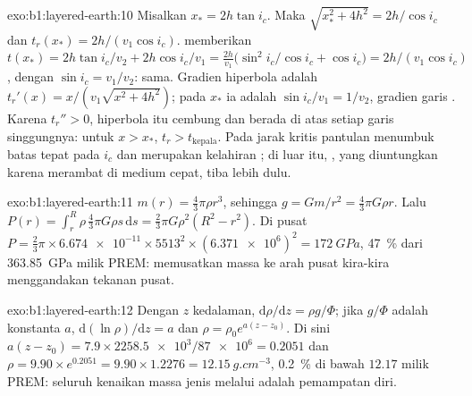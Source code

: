 \begin{solution}{exo:b1:layered-earth:10}
Misalkan $x_* = 2h\tan i_c$. Maka $\sqrt{x_*^2 + 4h^2} = 2h/\cos i_c$ dan
$t_r(x_*) = 2h/(v_1\cos i_c)$.  memberikan
$t(x_*) = 2h\tan i_c/v_2 + 2h\cos i_c/v_1 = \frac{2h}{v_1}\bigl(\sin^2 i_c/\cos
i_c + \cos i_c\bigr) = 2h/(v_1\cos i_c)$, dengan $\sin i_c = v_1/v_2$: sama.
Gradien hiperbola adalah $t_r'(x) = x/(v_1\sqrt{x^2 + 4h^2})$; pada $x_*$ ia adalah
$\sin i_c/v_1 = 1/v_2$, gradien garis . Karena
$t_r'' > 0$, hiperbola itu cembung dan berada di atas setiap garis singgungnya: untuk
$x > x_*$, $t_r > t_{\text{kepala}}$. Pada jarak kritis pantulan
menumbuk batas tepat pada $i_c$ dan merupakan kelahiran ; di luar itu,
, yang diuntungkan karena merambat di medium cepat, tiba lebih dulu.
\end{solution}

\begin{solution}{exo:b1:layered-earth:11}
$m(r) = \tfrac43\pi\rho r^3$, sehingga $g = Gm/r^2 = \tfrac43\pi G\rho r$. Lalu
$P(r) = \int_r^R \rho\,\tfrac43\pi G\rho s\,\mathrm ds = \tfrac23\pi G\rho^2(R^2
- r^2)$. Di pusat $P = \tfrac23\pi\times\num{6.674e-11}\times5513^2\times
(\num{6.371e6})^2 = \qty{172}{GPa}$, \qty{47}{\percent} dari
\qty{363.85}{GPa} milik PREM: memusatkan massa ke arah pusat kira-kira menggandakan
tekanan pusat.
\end{solution}

\begin{solution}{exo:b1:layered-earth:12}
Dengan $z$ kedalaman, $\mathrm d\rho/\mathrm dz = \rho g/\Phi$; jika $g/\Phi$ adalah
konstanta $a$, $\mathrm d(\ln\rho)/\mathrm dz = a$ dan $\rho = \rho_0
e^{a(z - z_0)}$. Di sini $a(z - z_0) = 7.9\times\num{2258.5e3}/\num{87e6} =
0.2051$ dan $\rho = 9.90\times e^{0.2051} = 9.90\times1.2276 =
\qty{12.15}{g.cm^{-3}}$, \qty{0.2}{\percent} di bawah $12.17$ milik PREM: seluruh
kenaikan massa jenis melalui  adalah pemampatan diri.
\end{solution}

